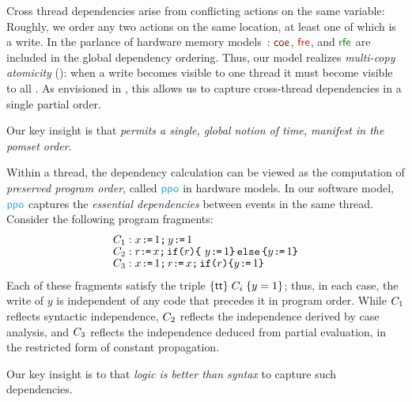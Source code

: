 Cross thread dependencies arise from conflicting actions on the same
variable: Roughly, we order any two actions on the same location, at least
one of which is a write.  In the parlance of hardware memory
models~\citep{alglave}: $\rcoe$, $\rfre$, and $\rrfex$ are included in the
global dependency ordering.  Thus, our model realizes \emph{multi-copy
  atomicity} (\mca): when a write becomes visible to one thread it must
become visible to all
\citep{DBLP:journals/pacmpl/PulteFDFSS18}.  As envisioned in
\cite[]{AlglaveThesis}, this allows us to capture cross-thread
dependencies in a single partial order.

Our key insight is that \emph{\mca{} permits a single, global notion of time,
  manifest in the pomset order}.

Within a thread, the dependency calculation can be viewed as the computation
of \emph{preserved program order}, called $\rppo$ in hardware models.  In our
software model, $\rppo$ captures the \emph{essential dependencies} between
events in the same thread.  Consider the following program fragments:
\begin{align*}
  & \aCmd_1: \PW{\aLoc}{1} \SEMI \PW{\bLoc}{1}
  \\[-1ex] & \aCmd_2: \aReg \GETS \aLoc \SEMI \IF{\aReg} \THEN\ \PW{\bLoc}{1} \ELSE \PW{\bLoc}{1}  \FI
  \\[-1ex] & \aCmd_3: \PW{\aLoc}{1} \SEMI \aReg \GETS \aLoc \SEMI \IF{\aReg} \THEN \PW{\bLoc}{1} \FI
\end{align*}
Each of these fragments satisfy the \citeauthor{Hoare:1969:ABC:363235.363259} triple $\{\mathsf{tt}\}\allowbreak\;C_i\;\allowbreak\{y =1\}$; thus, in each
case, the write of $y$ is independent of any code that precedes it in program
order. While $C_1$ reflects syntactic independence, $C_2$ reflects
the independence derived by case analysis, and $C_3$ reflects the
independence deduced from partial evaluation, in the restricted form of
constant propagation.

Our key insight is to that \emph{logic is better than syntax} to capture such
dependencies.

